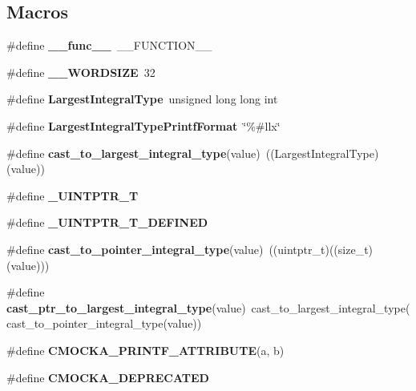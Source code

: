\subsection*{Macros}
\begin{DoxyCompactItemize}
\item 
\mbox{\label{group__cmocka_ga7d6e1cf1a8d53f38471e9e9db3faf740}} 
\#define {\bfseries \+\_\+\+\_\+func\+\_\+\+\_\+}~\+\_\+\+\_\+\+F\+U\+N\+C\+T\+I\+O\+N\+\_\+\+\_\+
\item 
\mbox{\label{group__cmocka_gaeea7ec6e47ecea02cc6812b268034b28}} 
\#define {\bfseries \+\_\+\+\_\+\+W\+O\+R\+D\+S\+I\+ZE}~32
\item 
\mbox{\label{group__cmocka_ga7abc548f6daf5f7ed7f471b1b9905f82}} 
\#define {\bfseries Largest\+Integral\+Type}~unsigned long long int
\item 
\mbox{\label{group__cmocka_ga3721808ed217a3abf4035bbef52621d9}} 
\#define {\bfseries Largest\+Integral\+Type\+Printf\+Format}~\char`\"{}\%\#llx\char`\"{}
\item 
\mbox{\label{group__cmocka_ga655cae71cb84ae751b9b400434aba9bc}} 
\#define {\bfseries cast\+\_\+to\+\_\+largest\+\_\+integral\+\_\+type}(value)~((Largest\+Integral\+Type)(value))
\item 
\mbox{\label{group__cmocka_ga86a77080f650963d177e7a97748488a5}} 
\#define {\bfseries \+\_\+\+U\+I\+N\+T\+P\+T\+R\+\_\+T}
\item 
\mbox{\label{group__cmocka_ga106239fcf6108905a1beb6837f7343c8}} 
\#define {\bfseries \+\_\+\+U\+I\+N\+T\+P\+T\+R\+\_\+\+T\+\_\+\+D\+E\+F\+I\+N\+ED}
\item 
\mbox{\label{group__cmocka_ga312645abd72ec83b9afed487642d0a18}} 
\#define {\bfseries cast\+\_\+to\+\_\+pointer\+\_\+integral\+\_\+type}(value)~((uintptr\+\_\+t)((size\+\_\+t)(value)))
\item 
\mbox{\label{group__cmocka_ga55238650c10063aca9388b4e598c813d}} 
\#define {\bfseries cast\+\_\+ptr\+\_\+to\+\_\+largest\+\_\+integral\+\_\+type}(value)~cast\+\_\+to\+\_\+largest\+\_\+integral\+\_\+type(cast\+\_\+to\+\_\+pointer\+\_\+integral\+\_\+type(value))
\item 
\mbox{\label{group__cmocka_gaa54cefac703e23a5cac73943f92f51b0}} 
\#define {\bfseries C\+M\+O\+C\+K\+A\+\_\+\+P\+R\+I\+N\+T\+F\+\_\+\+A\+T\+T\+R\+I\+B\+U\+TE}(a,  b)
\item 
\mbox{\label{group__cmocka_ga1c95ef085a988473b2b286a97d81467c}} 
\#define {\bfseries C\+M\+O\+C\+K\+A\+\_\+\+D\+E\+P\+R\+E\+C\+A\+T\+ED}
\end{DoxyCompactItemize}
